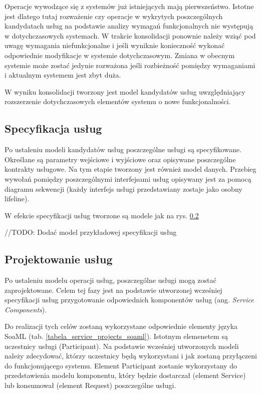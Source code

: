 Operacje wywodzące się z systemów już istniejących mają pierwszeństwo. Istotne jest dlatego tutaj rozważenie czy operacje w wykrytych poszczególnych kandydatach usług na podstawie analizy wymagań funkcjonalnych nie występują w dotychczasowych systemach. W trakcie konsolidacji ponownie należy wziąć pod uwagę wymagania niefunkcjonalne i jeśli wyniknie konieczność wykonać odpowiednie modyfikacje w systemie dotychczasowym. Zmiana w obecnym systemie może zostać jedynie rozważona jeśli rozbieżność pomiędzy wymaganiami i aktualnym systemem jest zbyt duża. 

W wyniku konsolidacji tworzony jest model kandydatów usług uwzględniający rozszerzenie dotychczasowych elementów systemu o nowe funkcjonalności.

\subsection{Specyfikacja usług}
Po ustaleniu modeli kandydatów usług poszczególne usługi są specyfikowane. Określane są parametry wejściowe i wyjściowe oraz opisywane poszczególne kontrakty usługowe. Na tym etapie tworzony jest również model danych. Przebieg wywołań pomiędzy poszczególnymi interfejsami usług opisywany jest za pomocą diagramu sekwencji (każdy interfejs usługi przedstawiany zostaje jako osobny lifeline).

W efekcie specyfikacji usług tworzone są modele jak na rys. \ref{}

//TODO: Dodać model przykładowej specyfikacji usług

\subsection{Projektowanie usług}
Po ustaleniu modelu operacji usług, poszczególne usługi mogą zostać zaprojektowane. Celem tej fazy jest na podstawie utworzonej wcześniej specyfikacji usług przygotowanie odpowiednich komponentów usług (ang. \emph{Service Components}). 

Do realizacji tych celów zostaną wykorzystane odpowiednie elementy języka SoaML (tab. \ref{tabela_service_projects_soaml}). Istotnym elemenetem są uczestnicy usługi (Participant).  Na podstawie wcześniej utworzonych modeli należy zdecydować, którzy uczestnicy będą wykorzystani i jak zostaną przyłączeni do funkcjonującego systemu. Element Participant zostanie wykorzystany do przedstawienia modelu komponentu, który będzie dostarczał (element Service) lub konsumował (element Request) poszczególne usługi. 

